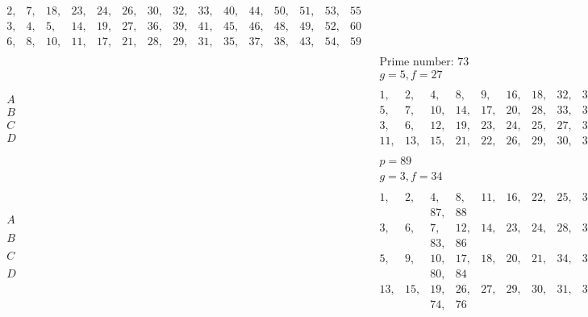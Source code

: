 \documentclass[twoside,12pt]{memoir}
\begin{document}
\[\begin{aligned}
\begin{array}{|rrrrrrrrrrrrrrr}
2,&7,& 18,&23,&24,&26,&30,&32,&33,&40,&44,&50,&51,&53,&55 \\ 
3,& 4,& 5,&14,&19,&27,&36,&39,&41,&45,&46,&48,&49,&52,&60 \\ 
6,&8,&10,&11,&17,&21,&28,& 29,&31,&35,&37,&38,&43,&54,&59
\end{array} \\
& \begin{array}{c} \text{Prime number: }73 \\  g=5, f=27 \end{array} \\
\begin{array}{l} A \\ B \\ C \\D \end{array} &  
\begin{array}{|rrrrrrrrrrrrrrrrrr} 
1,&2,&4,&8,&9,&16,&18,&32,&36,&37,&41,&55,&57,&64,&65,&69,&71,&72 \\ 
5,&7,& 10,&14,&17,&20,&28,&33,&34,&39,&40,&45,&53,&56,&59,&63,&66,&68 \\ 
3,& 6,& 12,&19,&23,&24,&25,&27,&35,&38,&46,&48,&49,&50,&54,&61,&67,&70 \\ 
11,&13,&15,&21,&22,&26,&29,& 30,&31,&42,&43,&44,&47,&51,&52,&58,&60,&62
\end{array}  \\
& \begin{array}{c} p=89 \\  g=3, f=34 \end{array} \\
\begin{array}{l} A \\  \\ B \\ \\ C \\ \\ D \\ \\ \end{array} & 
\begin{array}{|rrrrrrrrrrrrrrrrrrrrrr} 
1,&2,&4,&8,&11,&16,&22,&25,&32,&39,&44,&45,&50,&57,&64,&67,&73,&78,&81,&85,\\
&&87,&88 \\ 
3,&6,&7,& 12,&14,&23,&24,&28,&33,&41,&43,&46,&48,&56,&61,&65,&66,&75,&77,&82 \\ 
&&83,&86 \\
5,& 9,& 10,&17,&18,&20,&21,&34,&36,&40,&42,&47,&49,&53,&55,&68,&69,&71,&72,&79 \\ 
&&80,&84&\\
13,&15,&19,&26,&27,&29,& 30,&31,&35,&37,&38,&51,&52,&54,&58,&59,&60,&62,&63,&70 \\
&&74,&76
\end{array} \\ \end{aligned}\]
\end{document}
